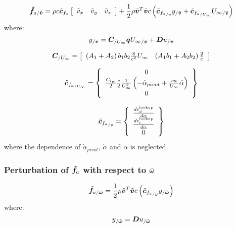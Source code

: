 \begin{equation}
\bm{\tilde{f}}_{a/\tilde{\bm{v}}} = 
	\rho c \tilde{\bm{c}}_{f_{a}} \left[
		\begin{array}{ccc}
			\tilde{v}_x & \tilde{v}_y & \tilde{v}_z
		\end{array} \right] +
	\frac{1}{2} \rho \tilde{\bm{v}}^T \tilde{\bm{v}} c
	\left(  \tilde{\bm{c}}_{{f_{a}}_{/y}} y_{/\tilde{\bm{v}}} + 
	\tilde{\bm{c}}_{{f_{a}}_{/U_{\infty}}} {U_\infty}_{/\tilde{\bm{v}}}  \right) 
\end{equation}
where:
\begin{equation}
y_{/\tilde{\bm{v}}} = 
	\bm{C}_{/U_{\infty}} \bm{q}{U_\infty}_{/\tilde{\bm{v}}}
	+ \bm{D} u_{/\tilde{\bm{v}}}
\end{equation}


\begin{equation}
\bm{C}_{/U_\infty} = \left[
	\begin{array}{cccccc}
	\left(  A_1 + A_2 \right) b_1 b_2 \frac{8}{c^2} U_\infty & \left(  A_1 b_1 + A_2 b_2 \right) \frac{2}{c}\\
	\end{array}
	\right]
\end{equation}

\begin{equation}
\tilde{\bm{c}}_{{f_{a}}_{/U_{\infty}}} = \left\{
	\begin{array}{c}
		0 \\
		\frac{C_{l_{\alpha}}}{2} \frac{c}{2} \frac{1}{U_\infty^2} 
		\left(  -\dot{\alpha}_{pivot} + \frac{c a}{U_\infty} \ddot{\alpha} \right) \\
		0
	\end{array} \right\}
\end{equation}

\begin{equation}
\tilde{\bm{c}}_{{f_{a}}_{/y}} = \left\{
	\begin{array}{cccc}
		\frac{ d c_d^{\text{lookup}}}{d \alpha}\\
		\frac{ d c_l^{\text{lookup}}}{d \alpha}\\
		0
	\end{array} \right\}
\end{equation}
where the dependence of $\dot{\alpha}_{pivot}$, $\dot{\alpha}$ and $\ddot{\alpha}$ is 
neglected.

\subsubsection{Perturbation of $\bm{\tilde{f}}_a$ with respect to $\tilde{\bm{\omega}}$}
\begin{equation}
\bm{\tilde{f}}_{a/\tilde{\bm{\omega}}} = 
	\frac{1}{2} \rho \tilde{\bm{v}}^T \tilde{\bm{v}} c
	\left(  \tilde{\bm{c}}_{{f_{a}}_{/\bm{y}}} y_{/\tilde{\bm{\omega}}}  \right) 
\end{equation}
where:
\begin{equation}
y_{/\tilde{\bm{\omega}}} = 
	\bm{D} u_{/\tilde{\bm{\omega}}}
\end{equation}

